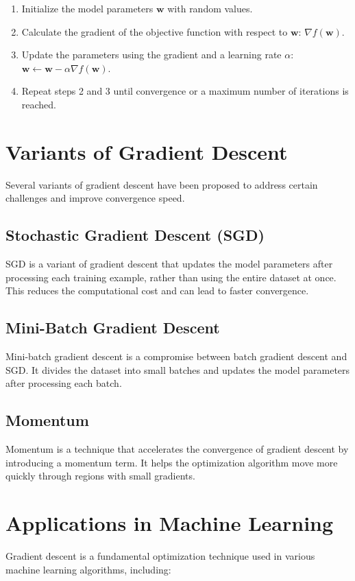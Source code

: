\documentclass{article}
\begin{document}
\begin{enumerate}
    \item Initialize the model parameters $\mathbf{w}$ with random values.
    \item Calculate the gradient of the objective function with respect to $\mathbf{w}$: $\nabla f(\mathbf{w})$.
    \item Update the parameters using the gradient and a learning rate $\alpha$: $\mathbf{w} \leftarrow \mathbf{w} - \alpha \nabla f(\mathbf{w})$.
    \item Repeat steps 2 and 3 until convergence or a maximum number of iterations is reached.
\end{enumerate}

\section{Variants of Gradient Descent}
Several variants of gradient descent have been proposed to address certain challenges and improve convergence speed.

\subsection{Stochastic Gradient Descent (SGD)}
SGD is a variant of gradient descent that updates the model parameters after processing each training example, rather than using the entire dataset at once. This reduces the computational cost and can lead to faster convergence.

\subsection{Mini-Batch Gradient Descent}
Mini-batch gradient descent is a compromise between batch gradient descent and SGD. It divides the dataset into small batches and updates the model parameters after processing each batch.

\subsection{Momentum}
Momentum is a technique that accelerates the convergence of gradient descent by introducing a momentum term. It helps the optimization algorithm move more quickly through regions with small gradients.

\section{Applications in Machine Learning}
Gradient descent is a fundamental optimization technique used in various machine learning algorithms, including:
\end{document}
